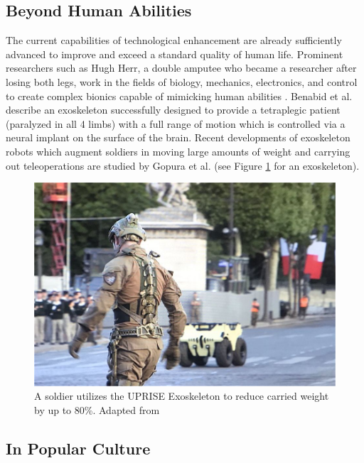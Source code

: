 \documentclass[10pt, oneside, letterpaper]{article}
\begin{document}
\begin{multicols}{2}
	\subsection{Beyond Human Abilities}

	The current capabilities of technological enhancement are already sufficiently advanced to improve and exceed a standard quality of human life. Prominent researchers such as Hugh Herr, a double amputee who became a researcher after losing both legs, work in the fields of biology, mechanics, electronics, and control to create complex bionics capable of mimicking human abilities \cite{Isobarista2018}. Benabid et al. \cite{Benabid2019} describe an exoskeleton successfully designed to provide a tetraplegic patient (paralyzed in all 4 limbs) with a full range of motion which is controlled via a neural implant on the surface of the brain. Recent developments of exoskeleton robots which augment soldiers in moving large amounts of weight and carrying out teleoperations are studied by Gopura et al. \cite{Gopura2016} (see Figure \ref{fig:uprise-exoskeleton} for an exoskeleton).

	\begin{figure}[H]
		\centering
		\includegraphics[width=\linewidth]{uprise-exoskeleton}
		\caption{A soldier utilizes the UPRISE Exoskeleton to reduce carried weight by up to 80\%. Adapted from \protect\cite{Army2019}}
		\label{fig:uprise-exoskeleton}
	\end{figure}

	\subsection{In Popular Culture}


\end{multicols}
\end{document}
